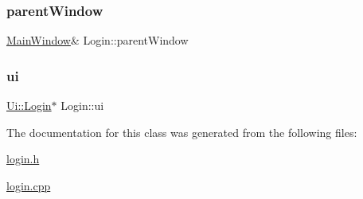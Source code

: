 \mbox{\label{class_login_a667004f2fd95bf92e14e68fdc0b74a1e}} 
\subsubsection{\texorpdfstring{parent\+Window}{parentWindow}}
{\footnotesize\ttfamily \hyperlink{class_main_window}{Main\+Window}\& Login\+::parent\+Window}

\mbox{\label{class_login_a55fa3b19085f864462451d3dd9efd2e1}} 
\subsubsection{\texorpdfstring{ui}{ui}}
{\footnotesize\ttfamily \hyperlink{class_ui_1_1_login}{Ui\+::\+Login}$\ast$ Login\+::ui\hspace{0.3cm}{\ttfamily [private]}}



The documentation for this class was generated from the following files\+:\begin{DoxyCompactItemize}
\item 
\hyperlink{login_8h}{login.\+h}\item 
\hyperlink{login_8cpp}{login.\+cpp}\end{DoxyCompactItemize}
